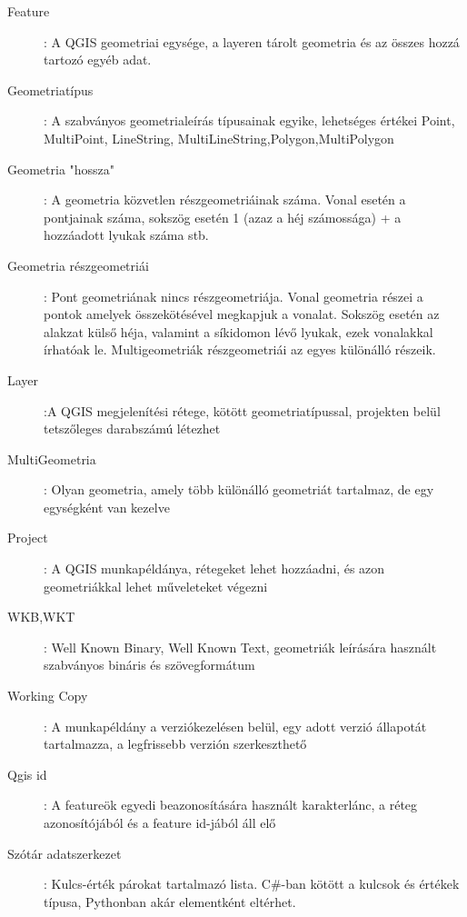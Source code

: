 \begin{description}
	\item[Feature]: A QGIS geometriai egysége, a layeren tárolt geometria és az összes hozzá tartozó egyéb adat.

	\item[Geometriatípus]: A szabványos geometrialeírás típusainak egyike, lehetséges értékei Point, MultiPoint, LineString, MultiLineString,Polygon,MultiPolygon

	\item[Geometria "hossza"]: A geometria közvetlen részgeometriáinak száma. Vonal esetén a pontjainak száma, sokszög esetén 1 (azaz a héj számossága) + a hozzáadott lyukak száma stb.

	\item[Geometria részgeometriái]: Pont geometriának nincs részgeometriája. Vonal geometria részei a pontok amelyek összekötésével megkapjuk a vonalat. Sokszög esetén az alakzat külső héja, valamint a síkidomon lévő lyukak, ezek vonalakkal írhatóak le. Multigeometriák részgeometriái az egyes különálló részeik.

	\item[Layer]:A QGIS megjelenítési rétege, kötött geometriatípussal, projekten belül tetszőleges darabszámú létezhet

	\item[MultiGeometria]: Olyan geometria, amely több különálló geometriát tartalmaz, de egy egységként van kezelve

	\item[Project]: A QGIS munkapéldánya, rétegeket lehet hozzáadni, és azon geometriákkal lehet műveleteket végezni

	\item[WKB,WKT]: Well Known Binary, Well Known Text, geometriák leírására használt szabványos bináris és szövegformátum

	\item[Working Copy]: A munkapéldány a verziókezelésen belül, egy adott verzió állapotát tartalmazza, a legfrissebb verzión szerkeszthető

	\item[Qgis id]: A featureök egyedi beazonosítására használt karakterlánc, a réteg azonosítójából és a feature id-jából áll elő

	\item[Szótár adatszerkezet]: Kulcs-érték párokat tartalmazó lista. C\#-ban kötött a kulcsok és értékek típusa, Pythonban akár elementként eltérhet.
\end{description}